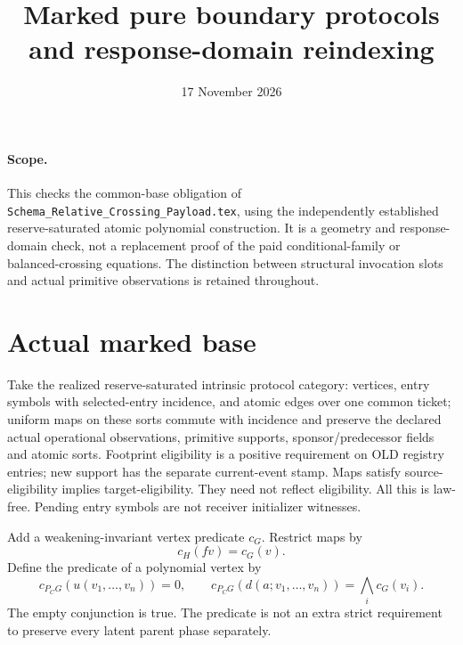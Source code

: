 \documentclass[11pt]{article}
\title{Marked pure boundary protocols and response-domain reindexing}
\date{17 November 2026}
\begin{document}
\maketitle
\paragraph{Scope.}
This checks the common-base obligation of \texttt{Schema\_Relative\_Crossing\_Payload.tex}, using the independently established reserve-saturated atomic polynomial construction. It is a geometry and response-domain check, not a replacement proof of the paid conditional-family or balanced-crossing equations. The distinction between structural invocation slots and actual primitive observations is retained throughout.

\section{Actual marked base}
Take the realized reserve-saturated intrinsic protocol category: vertices, entry symbols with selected-entry incidence, and atomic edges over one common ticket; uniform maps on these sorts commute with incidence and preserve the declared actual operational observations, primitive supports, sponsor/predecessor fields and atomic sorts. Footprint eligibility is a positive requirement on OLD registry entries; new support has the separate current-event stamp. Maps satisfy source-eligibility implies target-eligibility. They need not reflect eligibility. All this is law-free. Pending entry symbols are not receiver initializer witnesses.

Add a weakening-invariant vertex predicate $c_G$. Restrict maps by
\[
                   c_H(fv)=c_G(v).
\]
Define the predicate of a polynomial vertex by
\[
 c_{P_CG}(u(v_1,\ldots,v_n))=0,\qquad
 c_{P_CG}(d(a;v_1,\ldots,v_n))=\bigwedge_i c_G(v_i).
\]
The empty conjunction is true. The predicate is not an extra strict requirement to preserve every latent parent phase separately.
\end{document}
